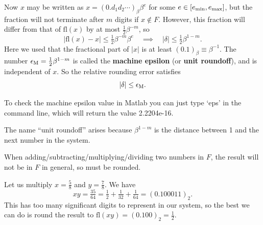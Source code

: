 \documentclass[
  letterpaper,
  DIV=11,
  numbers=noendperiod]{scrreprt}
\begin{document}
Now \(x\) may be written as \(x=(0.d_1d_2\cdots)_\beta\beta^e\) for some
\(e\in[e_{\rm min},e_{\rm max}]\), but the fraction will not terminate
after \(m\) digits if \(x\notin F\). However, this fraction will differ
from that of \(\mathrm{fl}(x)\) by at most \(\tfrac12\beta^{-m}\), so \[
|\mathrm{fl}(x) - x| \leq \tfrac12\beta^{-m}\beta^e \quad \implies \quad |\delta| \leq \tfrac12\beta^{1-m}.
\] Here we used that the fractional part of \(|x|\) is at least
\((0.1)_\beta \equiv \beta^{-1}\). The number
\(\epsilon_{\rm M} = \tfrac12\beta^{1-m}\) is called the \textbf{machine
epsilon} (or \textbf{unit roundoff}), and is independent of \(x\). So
the relative rounding error satisfies \[
|\delta| \leq \epsilon_{\rm M}.
\]

\begin{tcolorbox}[enhanced jigsaw, opacityback=0, breakable, title=\textcolor{quarto-callout-note-color}{\faInfo}\hspace{0.5em}{Note}, arc=.35mm, coltitle=black, opacitybacktitle=0.6, bottomrule=.15mm, leftrule=.75mm, left=2mm, colbacktitle=quarto-callout-note-color!10!white, titlerule=0mm, toptitle=1mm, bottomtitle=1mm, colframe=quarto-callout-note-color-frame, rightrule=.15mm, colback=white, toprule=.15mm]

To check the machine epsilon value in Matlab you can just type `eps' in
the command line, which will return the value 2.2204e-16.

\end{tcolorbox}

\begin{tcolorbox}[enhanced jigsaw, opacityback=0, breakable, title=\textcolor{quarto-callout-note-color}{\faInfo}\hspace{0.5em}{Note}, arc=.35mm, coltitle=black, opacitybacktitle=0.6, bottomrule=.15mm, leftrule=.75mm, left=2mm, colbacktitle=quarto-callout-note-color!10!white, titlerule=0mm, toptitle=1mm, bottomtitle=1mm, colframe=quarto-callout-note-color-frame, rightrule=.15mm, colback=white, toprule=.15mm]

The name ``unit roundoff'' arises because \(\beta^{1-m}\) is the
distance between 1 and the next number in the system.

\end{tcolorbox}

When adding/subtracting/multiplying/dividing two numbers in \(F\), the
result will not be in \(F\) in general, so must be rounded.

Let us multiply \(x=\tfrac58\) and \(y=\tfrac78\). We have \[
xy = \tfrac{35}{64} = \tfrac12 + \tfrac1{32} + \tfrac1{64} = (0.100011)_2.
\] This has too many significant digits to represent in our system, so
the best we can do is round the result to
\(\mathrm{fl}(xy) = (0.100)_2 = \tfrac12\).
\end{document}
